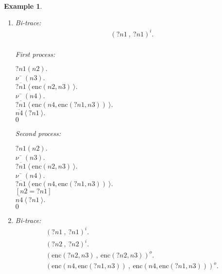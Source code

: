 \documentclass{article}
\newenvironment{example}{\begin{exa} \rm}{\end{exa}}
\newtheorem{exa}[theorem]{Example}
\begin{document}
\begin{example}
\begin{enumerate}
First process: 
\begin{tabbing}$\nu$ \= $(n4).$ \\ 
$\overline{?n1}~\langle ~\mbox{enc}(n4,\mbox{enc}(?n1,n3)) ~ \rangle.$ \\ 
$\overline{n4}~\langle ~?n1 ~ \rangle.$ \\ 
$0$ \\ 
\end{tabbing}
Second process: 
\begin{tabbing}$\nu$ \= $(n4).$ \\ 
$\overline{?n1}~\langle ~\mbox{enc}(n4,\mbox{enc}(?n1,n3)) ~ \rangle.$ \\ 
${[?n2 = ?n1 ]}$ \\ 
$\overline{n4}~\langle ~?n1 ~ \rangle.$ \\ 
$0$ \\ 
\end{tabbing}
\item 
Bi-trace: 
$$
\begin{array}{l}
(?n1~ , ~ ?n1)^i. \\ 
\end{array}
$$

First process: 
\begin{tabbing}$?n1(n2).$ \\ 
$\nu$ \= $(n3).$ \\ 
$\overline{?n1}~\langle ~\mbox{enc}(n2,n3) ~ \rangle.$ \\ 
$\nu$ \= $(n4).$ \\ 
$\overline{?n1}~\langle ~\mbox{enc}(n4,\mbox{enc}(?n1,n3)) ~ \rangle.$ \\ 
$\overline{n4}~\langle ~?n1 ~ \rangle.$ \\ 
$0$ \\ 
\end{tabbing}
Second process: 
\begin{tabbing}$?n1(n2).$ \\ 
$\nu$ \= $(n3).$ \\ 
$\overline{?n1}~\langle ~\mbox{enc}(n2,n3) ~ \rangle.$ \\ 
$\nu$ \= $(n4).$ \\ 
$\overline{?n1}~\langle ~\mbox{enc}(n4,\mbox{enc}(?n1,n3)) ~ \rangle.$ \\ 
${[n2 = ?n1 ]}$ \\ 
$\overline{n4}~\langle ~?n1 ~ \rangle.$ \\ 
$0$ \\ 
\end{tabbing}
\item 
Bi-trace: 
$$
\begin{array}{l}
(?n1~ , ~ ?n1)^i. \\ 
(?n2~ , ~ ?n2)^i. \\ 
(\mbox{enc}(?n2,n3)~ , ~ \mbox{enc}(?n2,n3))^o. \\ 
(\mbox{enc}(n4,\mbox{enc}(?n1,n3))~ , ~ \mbox{enc}(n4,\mbox{enc}(?n1,n3)))^o. \\ 
\end{array}
$$


\end{enumerate}
\end{example}
\end{document}
